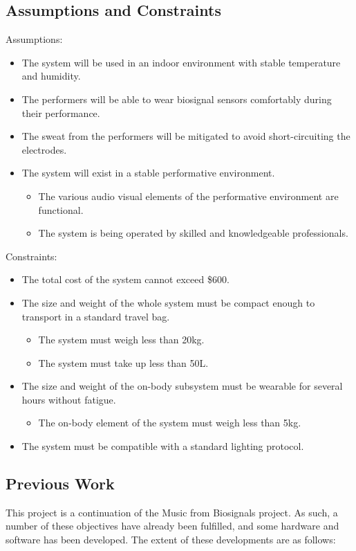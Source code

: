 \subsection{Assumptions and Constraints}
Assumptions:
\begin{itemize}
    \item The system will be used in an indoor environment with stable temperature and humidity.
    \item The performers will be able to wear biosignal sensors comfortably during their performance.
    \item The sweat from the performers will be mitigated to avoid short-circuiting the electrodes.
    \item The system will exist in a stable performative environment.
        \begin{itemize}
                \item The various audio visual elements of the performative environment are functional.
                \item The system is being operated by skilled and knowledgeable professionals.
        \end{itemize}
\end{itemize}

Constraints:
\begin{itemize}
    \item The total cost of the system cannot exceed \$600.
    \item The size and weight of the whole system must be compact enough to transport in a standard travel bag.
        \begin{itemize}
                \item The system must weigh less than 20kg.
                \item The system must take up less than 50L.
        \end{itemize}
    \item The size and weight of the on-body subsystem must be wearable for several hours without fatigue.
        \begin{itemize}
                \item The on-body element of the system must weigh less than 5kg.
        \end{itemize}
    \item The system must be compatible with a standard lighting protocol.
\end{itemize}

\subsection{Previous Work}
This project is a continuation of the Music from Biosignals project.
As such, a number of these objectives have already been fulfilled, and some hardware and software has been developed.
The extent of these developments are as follows:

